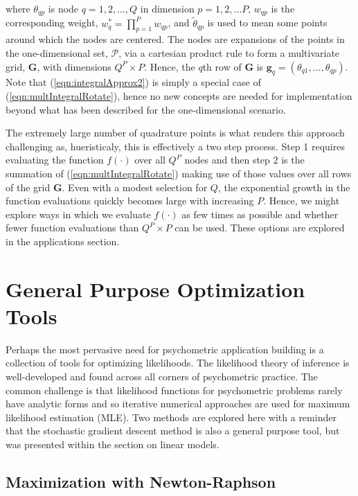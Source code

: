 \documentclass[12pt]{article}
\begin{document}
\noindent where $\theta_{qp}$ is node $q = 1, 2, \ldots, Q$ in dimension $p = 1,2, \ldots P$, $w_{qp}$ is the corresponding weight, $w_q^* = \prod^P_{p=1}w_{qp}$, and $\widetilde{\theta}_{qp}$ is used to mean some points around which the nodes are centered. The nodes are expansions of the points in the one-dimensional set, $\mathcal{P}$, via a cartesian product rule to form a multivariate grid, $\bm{G}$, with dimensions $Q^P\times P$. Hence, the $q$th row of $\bm{G}$ is $\bm{g}_q = (\theta_{q1}, \ldots, \theta_{qp})$.  Note that (\ref{eqn:integralApprox2}) is simply a special case of (\ref{eqn:multIntegralRotate}), hence no new concepts are needed for implementation beyond what has been described for the one-dimensional scenario. 

The extremely large number of quadrature points is what renders this approach challenging as, hueristicaly, this is effectively a two step process. Step 1 requires evaluating the function $f(\cdot)$ over all $Q^P$ nodes and then step 2 is the summation of (\ref{eqn:multIntegralRotate}) making use of those values over all rows of the grid $\bm{G}$. Even with a modest selection for $Q$, the exponential growth in the function evaluations quickly becomes large with increasing $P$. Hence, we might explore ways in which we evaluate $f(\cdot)$ as few times as possible and whether fewer function evaluations than $Q^P\times P$ can be used. These options are explored in the applications section.

\section*{General Purpose Optimization Tools}

Perhaps the most pervasive need for psychometric application building is a collection of tools for optimizing likelihoods. The likelihood theory of inference is well-developed \cite{king:1998} and found across all corners of psychometric practice. The common challenge is that likelihood functions for psychometric problems rarely have analytic forms and so iterative numerical approaches are used for maximum likelihood estimation (MLE). Two methods are explored here with a reminder that the stochastic gradient descent method is also a general purpose tool, but was presented within the section on linear models.

\subsection*{Maximization with Newton-Raphson}
\end{document}

